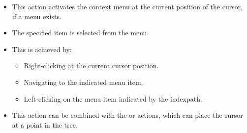 \begin{itemize}
\item This action activates the context menu at the current position of the cursor, if a menu exists.
\item The specified item is  selected from the menu.
\item This is achieved by:
  \begin{itemize}
    \item Right-clicking at the current cursor position.
    \item Navigating to the indicated menu item.
    \item Left-clicking on the menu item indicated by the indexpath.
  \end{itemize}
\item This action can be combined with the  or  actions, which can place the cursor at a point in the tree.
\end{itemize}
 